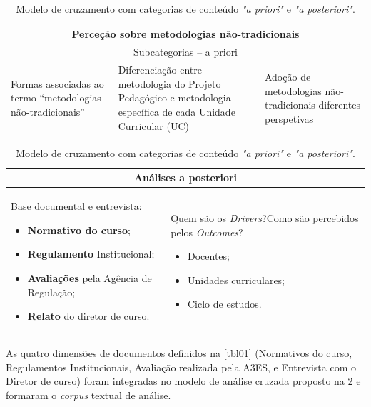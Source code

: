 \documentclass{textolivre-html}
\begin{document}
\begin{table}[htbp]
\caption{Modelo de cruzamento com categorias de conteúdo \textit{"a priori"} e \textit{"a posteriori"}.}
\label{tbl02}
\begin{tabularx}{\textwidth}{p{}
p{}p{}}
\toprule
\multicolumn{3}{c}{\textbf{Perceção sobre metodologias não-tradicionais}} \\ 
\midrule
\multicolumn{3}{c}{Subcategorias – a priori} \\ 
\midrule
Formas associadas ao termo “metodologias não-tradicionais” &
Diferenciação entre metodologia do Projeto Pedagógico e metodologia específica de cada Unidade Curricular (UC) &
  Adoção de metodologias não-tradicionais diferentes perspetivas \\ \midrule
\end{tabularx}

\begin{tabularx}{\textwidth}{p{}
p{}}
\multicolumn{2}{c}{\textbf{Análises a posteriori}} \\ \midrule
Base documental e entrevista:\newline
\begin{itemize}
    \item \textbf{Normativo do curso};
    \item \textbf{Regulamento} Institucional;
    \item \textbf{Avaliações} pela Agência de Regulação;
    \item \textbf{Relato} do diretor de curso.
\end{itemize} &
Quem são os \textit{Drivers}?\newline Como são percebidos pelos  \textit{Outcomes}? \newline
\begin{itemize}
    \item Docentes;
    \item Unidades curriculares;
    \item Ciclo de estudos.
\end{itemize} \\
\bottomrule
\end{tabularx}
\end{table}

As quatro dimensões de documentos definidos na \cref{tbl01} (Normativos do curso, Regulamentos Institucionais, Avaliação realizada pela A3ES, e Entrevista com o Diretor de curso) foram integradas no modelo de análise cruzada proposto na \cref{tbl02} e formaram o \textit{corpus} textual de análise.
\end{document}
